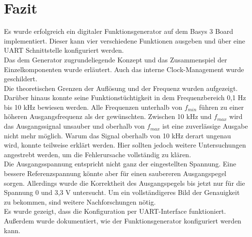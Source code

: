 \chapter{Fazit}
Es wurde erfolgreich ein digitaler Funktionsgenerator auf dem Basys 3 Board implementiert.
Dieser kann vier verschiedene Funktionen ausgeben und über eine UART Schnittstelle konfiguriert werden. \\
Das dem Generator zugrundeliegende Konzept und das Zusammenspiel der Einzelkomponenten wurde erläutert.
Auch das interne Clock-Management wurde geschildert. \\
Die theoretischen Grenzen der Auflösung und der Frequenz wurden aufgezeigt. 
Darüber hinaus konnte seine Funktionstüchtigkeit in dem Frequenzbereich 0,1 Hz bis 10 kHz bewiesen werden.
Alle Frequenzen unterhalb von $f_{min}$ führen zu einer höheren Ausgangsfrequenz als der gewünschten.
Zwischen 10 kHz und $f_{max}$ wird das Ausgangssignal unsauber und oberhalb von $f_{max}$ ist eine zuverlässige Ausgabe nicht mehr möglich.
Warum das Signal oberhalb von 10 kHz derart ungenau wird, konnte teilweise erklärt werden.
Hier sollten jedoch weitere Untersuchungen angestrebt werden, um die Fehlerursache vollständig zu klären.\\
Die Ausgangsspannung entspricht nicht ganz der eingestellten Spannung.
Eine bessere Referenzspannung könnte aber für einen saubereren Ausgangspegel sorgen.
Allerdings wurde die Korrektheit des Ausgangspegels bis jetzt nur für die Spannung 0 und 3,3 V untersucht.
Um ein vollständigeres Bild der Genauigkeit zu bekommen, sind weitere Nachforschungen nötig.\\
Es wurde gezeigt, dass die Konfiguration per UART-Interface funktioniert.
Außerdem wurde dokumentiert, wie der Funktionsgenerator konfiguriert werden kann.
